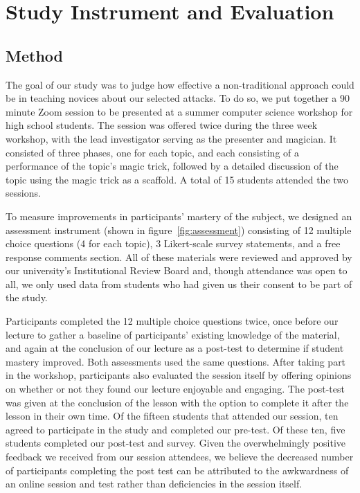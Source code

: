 \section{Study Instrument and Evaluation}
\label{SEC:evaluation}

\subsection{Method}

The goal of our study was to judge how effective a non-traditional approach
could be in teaching novices about our selected attacks.  To do so,
we put together a 90 minute Zoom session to be presented at a summer
computer science workshop for high school students.  The session was
offered twice during the three week workshop, with the lead investigator
serving as the presenter and magician.  It consisted of three phases, one
for each topic, and each consisting of a performance of the topic's magic
trick, followed by a detailed discussion of the topic using the magic trick
as a scaffold.  A total of 15 students attended the two sessions.

To measure improvements in participants' mastery of the subject, we
designed an assessment instrument (shown in figure~\ref{fig:assessment})
consisting of
12 multiple choice questions (4 for each topic),
3 Likert-scale survey statements,
and a free response comments section.
All of these materials were reviewed and approved by our university's
Institutional Review Board and, though attendance was open to all, we only
used data from students who had given us their consent to be part of the
study.

Participants completed the 12 multiple choice questions twice,
once before our lecture to gather a baseline of
participants' existing knowledge of the material,
and again at the conclusion of our
lecture as a post-test to determine if student mastery improved.
Both assessments used the same questions.
After taking part in the workshop, participants also evaluated the session
itself by offering opinions on whether or not they found our lecture
enjoyable and engaging.
The post-test was given at the conclusion of the lesson
with the option to complete it after the lesson in their own time.
Of the fifteen students that attended our session, ten agreed to participate in
the study and completed our pre-test. Of these ten, five
students completed our post-test and survey.  Given the overwhelmingly
positive feedback we received from our session attendees, we believe the
decreased number of participants completing the post test can be attributed
to the awkwardness of an online session and test rather than deficiencies in
the session itself.


